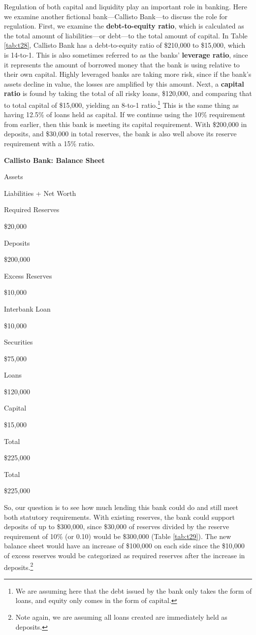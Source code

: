 \documentclass[
]{book}
\begin{document}
Regulation of both capital and liquidity play an important role in banking. Here we examine another fictional bank---Callisto Bank---to discuss the role for regulation. First, we examine the \textbf{debt-to-equity ratio}, which is calculated as the total amount of liabilities---or debt---to the total amount of capital. In Table \ref{tab:t28}, Callisto Bank has a debt-to-equity ratio of \$210,000 to \$15,000, which is 14-to-1. This is also sometimes referred to as the banks' \textbf{leverage ratio}, since it represents the amount of borrowed money that the bank is using relative to their own capital. Highly leveraged banks are taking more risk, since if the bank's assets decline in value, the losses are amplified by this amount. Next, a \textbf{capital ratio} is found by taking the total of all risky loans, \$120,000, and comparing that to total capital of \$15,000, yielding an 8-to-1 ratio.\footnote{We are assuming here that the debt issued by the bank only takes the form of loans, and equity only comes in the form of capital.} This is the same thing as having 12.5\% of loans held as capital. If we continue using the 10\% requirement from earlier, then this bank is meeting its capital requirement. With \$200,000 in deposits, and \$30,000 in total reserves, the bank is also well above its reserve requirement with a 15\% ratio.

\label{tab:t28}\textbf{Callisto Bank: Balance Sheet}

Assets

Liabilities + Net Worth

Required Reserves

\$20,000

Deposits

\$200,000

Excess Reserves

\$10,000

Interbank Loan

\$10,000

Securities

\$75,000

Loans

\$120,000

Capital

\$15,000

Total

\$225,000

Total

\$225,000

So, our question is to see how much lending this bank could do and still meet both statutory requirements. With existing reserves, the bank could support deposits of up to \$300,000, since \$30,000 of reserves divided by the reserve requirement of 10\% (or 0.10) would be \$300,000 (Table \ref{tab:t29}). The new balance sheet would have an increase of \$100,000 on each side since the \$10,000 of excess reserves would be categorized as required reserves after the increase in deposits.\footnote{Note again, we are assuming all loans created are immediately held as deposits.}
\end{document}
